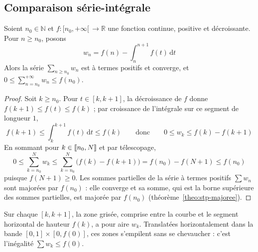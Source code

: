 \subsection{Comparaison série-intégrale}

\begin{theo}
\label{theo:serie-integrale}
Soient $n_0\in\mathbb{N}$ et $f:[n_0,+\infty[\,\to\mathbb{R}$ une fonction continue, positive et décroissante. Pour $n\geq n_0$, posons
\[w_n=f(n)-\int_{n}^{n+1}f(t)\,\mathrm{d}t\]
Alors la série $\sum_{n\geq n_0}w_n$ est à termes positifs et converge, et $\displaystyle 0\leq\sum_{n=n_0}^{+\infty}w_n\leq f(n_0)$.
\end{theo}

\begin{proof}
Soit $k\geq n_0$. Pour $t\in[k,k+1]$, la décroissance de $f$ donne $f(k+1)\leq f(t)\leq f(k)$ ; par croissance de l'intégrale sur ce segment de longueur $1$,
\[f(k+1)\leq\int_{k}^{k+1}f(t)\,\mathrm{d}t\leq f(k)\qquad\text{donc}\qquad 0\leq w_k\leq f(k)-f(k+1)\]
En sommant pour $k\in\llbracket n_0,N \rrbracket$ et par télescopage,
\[0\leq\sum_{k=n_0}^{N}w_k\leq\sum_{k=n_0}^{N}\big(f(k)-f(k+1)\big)=f(n_0)-f(N+1)\leq f(n_0)\]
puisque $f(N+1)\geq 0$. Les sommes partielles de la série à termes positifs $\sum w_n$ sont majorées par $f(n_0)$ : elle converge et sa somme, qui est la borne supérieure des sommes partielles, est majorée par $f(n_0)$ (théorème~\ref{theo:stp-majoree}).
\end{proof}

\begin{center}
\end{center}
\noindent Sur chaque $[k,k+1]$, la zone grisée, comprise entre la courbe et le segment horizontal de hauteur $f(k)$, a pour aire $w_k$. Translatées horizontalement dans la bande $[0,1]\times[0,f(0)]$, ces zones s'empilent sans se chevaucher : c'est l'inégalité $\sum w_k\leq f(0)$.

